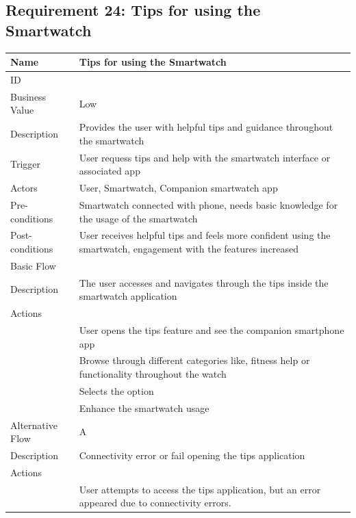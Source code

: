 \documentclass{article}
\begin{document}
\subsection{Requirement 24: Tips for using the Smartwatch}
	\begin{center}
		\begin{tabularx}{1.0\textwidth}{|>{\raggedright\arraybackslash}p{}|>{\raggedright\arraybackslash}X|}
			\hline
			Name             & Tips for using the Smartwatch \\ \hline
			ID               & 24 \\ \hline
			Business Value   & Low \\ \hline
			Description      & Provides the user with helpful tips and guidance throughout the smartwatch \\ \hline
			Trigger          & User requess tips and help with the smartwatch interface or associated app \\ \hline
			Actors           & User, Smartwatch, Companion smartwatch app \\ \hline
			Pre-conditions   & Smartwatch connected with phone, needs basic knowledge for the usage of the smartwatch \\ \hline
			Post-conditions  & User receives helpful tips and feels more confident using the smartwatch, engagement with the features increased \\ \hline
			Basic Flow       & \\ \hline
							Description & The user accesses and navigates through the tips inside the smartwatch application \\ \hline
							Actions & \\ \hline
							1 & User opens the tips feature and see the companion smartphone app \\ \hline
							2 & Browse through different categories like, fitness help or functionality throughout the watch \\ \hline
							3 & Selects the option \\ \hline
							4 & Enhance the smartwatch usage \\ \hline
			Alternative Flow & A \\ \hline
							Description & Connectivity error or fail opening the tips application \\ \hline
							Actions & \\ \hline
							1 & User attempts to access the tips application, but an error appeared due to connectivity errors. \\ \hline

\end{tabularx}
\end{center}
\end{document}
